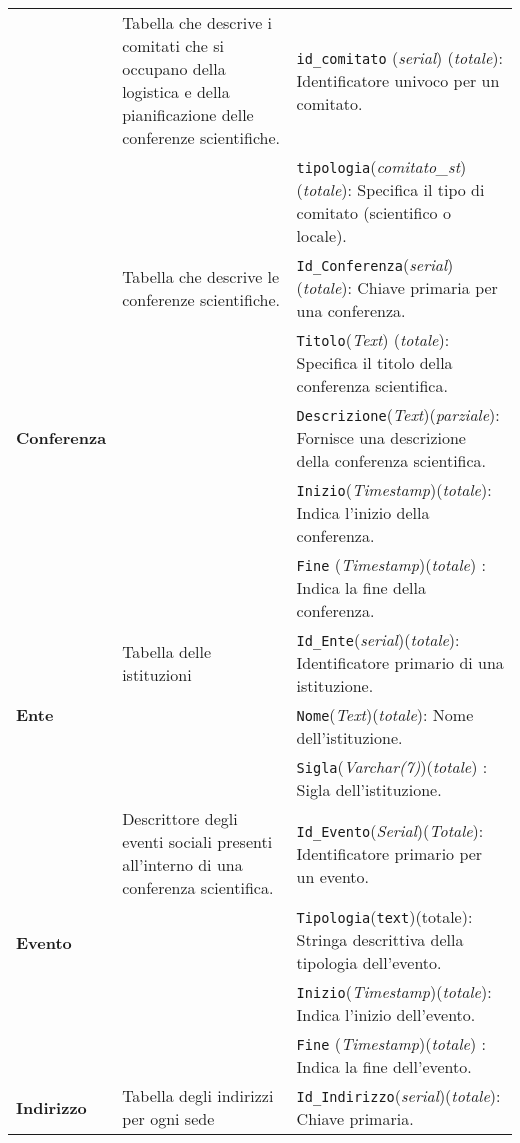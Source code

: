 \begin{longtable}{|p{}|p{}|p{}|}
\hline
\endlastfoot
	\multirow{2}{*}{\textbf{Comitato}} & Tabella che descrive i comitati che si occupano della logistica e della pianificazione delle conferenze scientifiche. & \texttt{id\_comitato} (\textit{serial}) (\textit{totale}): Identificatore univoco per un comitato. \\ 
	& & \texttt{tipologia}(\textit{comitato\_st})(\textit{totale}): Specifica il tipo di comitato (scientifico o locale). \\
	\hline
	\multirow{5}{*}{\textbf{Conferenza}} & Tabella che descrive le conferenze scientifiche. & \texttt{Id\_Conferenza}(\textit{serial})(\textit{totale}): Chiave primaria per una conferenza. \\
	& & \texttt{Titolo}(\textit{Text}) (\textit{totale}): Specifica il titolo della conferenza scientifica. \\
	& & \texttt{Descrizione}(\textit{Text})(\textit{parziale}): Fornisce una descrizione della conferenza scientifica. \\
	& & \texttt{Inizio}(\textit{Timestamp})(\textit{totale}): Indica l'inizio della conferenza. \\
	& & \texttt{Fine} (\textit{Timestamp})(\textit{totale}) : Indica la fine della conferenza. \\
	\hline
	\multirow{3}{*}{\textbf{Ente}} & Tabella delle istituzioni & \texttt{Id\_Ente}(\textit{serial})(\textit{totale}): Identificatore primario di una istituzione. \\
	& & \texttt{Nome}(\textit{Text})(\textit{totale}): Nome dell'istituzione. \\
	& & \texttt{Sigla}(\textit{Varchar(7)})(\textit{totale}) : Sigla dell'istituzione. \\
	\hline
	\multirow{4}{*}{\textbf{Evento}} & Descrittore degli eventi sociali presenti all'interno di una conferenza scientifica.&  \texttt{Id\_Evento}(\textit{Serial})(\textit{Totale}): Identificatore primario per un evento. \\
	& & \texttt{Tipologia}(\texttt{text})(totale): Stringa descrittiva della tipologia dell'evento. \\
	& & \texttt{Inizio}(\textit{Timestamp})(\textit{totale}): Indica l'inizio dell'evento. \\
	& & \texttt{Fine} (\textit{Timestamp})(\textit{totale}) : Indica la fine dell'evento. \\
	\hline
	\multirow{7}{*}{\textbf{Indirizzo}} & Tabella degli indirizzi per ogni sede & \texttt{Id\_Indirizzo}(\textit{serial})(\textit{totale}): Chiave primaria. \\

\end{longtable}

